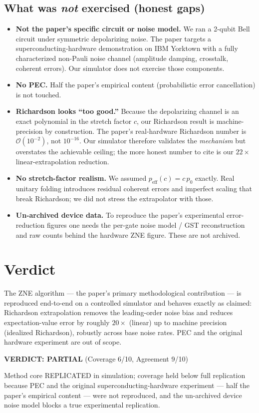 \documentclass[11pt]{article}
\begin{document}
\subsection*{What was \emph{not} exercised (honest gaps)}
\begin{itemize}
  \item \textbf{Not the paper's specific circuit or noise model.} We ran a
        2-qubit Bell circuit under symmetric depolarizing noise. The paper
        targets a superconducting-hardware demonstration on IBM Yorktown
        with a fully characterized non-Pauli noise channel (amplitude damping,
        crosstalk, coherent errors). Our simulator does not exercise those
        components.
  \item \textbf{No PEC.} Half the paper's empirical content
        (probabilistic error cancellation) is not touched.
  \item \textbf{Richardson looks ``too good.''} Because the depolarizing
        channel is an exact polynomial in the stretch factor $c$, our
        Richardson result is machine-precision by construction. The paper's
        real-hardware Richardson number is $\mathcal{O}(10^{-2})$, not
        $10^{-16}$. Our simulator therefore validates the \emph{mechanism}
        but overstates the achievable ceiling; the more honest number to
        cite is our $22\times$ linear-extrapolation reduction.
  \item \textbf{No stretch-factor realism.} We assumed
        $p_{\mathrm{eff}}(c) = c\,p_0$ exactly. Real unitary folding introduces
        residual coherent errors and imperfect scaling that break Richardson;
        we did not stress the extrapolator with those.
  \item \textbf{Un-archived device data.} To reproduce the paper's
        experimental error-reduction figures one needs the per-gate noise
        model / GST reconstruction and raw counts behind the hardware ZNE
        figure. These are not archived.
\end{itemize}

\section{Verdict}
The ZNE algorithm --- the paper's primary methodological contribution --- is
reproduced end-to-end on a controlled simulator and behaves exactly as
claimed: Richardson extrapolation removes the leading-order noise bias and
reduces expectation-value error by roughly $20\times$ (linear) up to machine
precision (idealized Richardson), robustly across base noise rates. PEC and
the original hardware experiment are out of scope.

\textbf{VERDICT: PARTIAL} \quad (Coverage 6/10, Agreement 9/10)

Method core REPLICATED in simulation; coverage held below full replication
because PEC and the original superconducting-hardware experiment --- half
the paper's empirical content --- were not reproduced, and the un-archived
device noise model blocks a true experimental replication.


\end{document}
